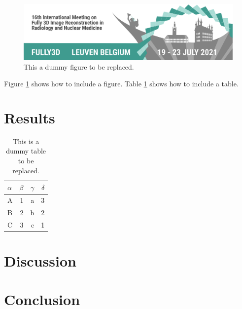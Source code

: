 \documentclass[11pt,twocolumn,twoside]{article}
\begin{document}
\begin{figure}
  \centering
  \includegraphics[width=1.0\textwidth]{./fig1.pdf}
  \caption{This a dummy figure to be replaced.}
  \label{fig:dummyfigure}
\end{figure}

Figure \ref{fig:dummyfigure} shows how to include a figure.
Table \ref{tab:dummytable} shows how to include a table.

\bigskip

\lipsum[2-7]


\section{Results}

\begin{table}
  \centering
  \sffamily
  \begin{tabular}{lrrr}
  \toprule
  $\alpha$   & $\beta$ & $\gamma$ & $\delta$ \\
  \midrule
  A          & 1       & a        & 3        \\
  B          & 2       & b        & 2        \\
  C          & 3       & c        & 1        \\
  \bottomrule
  \end{tabular}
  \caption{This is a dummy table to be replaced.}
  \label{tab:dummytable}
\end{table}

\lipsum[2-9]

\section{Discussion}
\lipsum[2-9]

\section{Conclusion}
\lipsum[2]

\footnotesize


\end{document}
